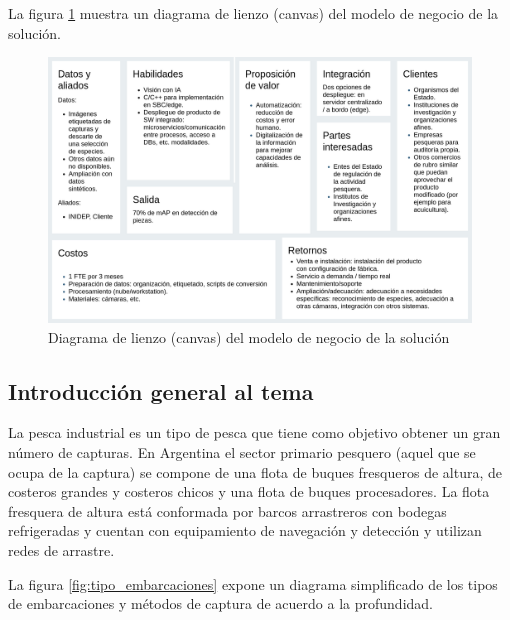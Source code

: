 \documentclass[11pt]{charter}
\begin{document}
La figura  \ref{fig:canvas} muestra un diagrama de lienzo (canvas) del modelo de negocio de la solución.

\vspace{25px}

\begin{figure}[htpb]
\centering 
\includegraphics[width=1\textwidth]{./Figuras/canvas.png}
\caption{Diagrama de lienzo (canvas) del modelo de negocio de la solución}
\label{fig:canvas}
\end{figure}

\vspace{25px}

\subsection{Introducción general al tema}

La pesca industrial es un tipo de pesca que tiene como objetivo obtener un gran número de capturas. En Argentina el sector primario pesquero (aquel que se ocupa de la captura) se compone de una flota de buques fresqueros de altura, de costeros grandes y costeros chicos y una flota de buques procesadores. La flota fresquera de altura está conformada por barcos arrastreros con bodegas refrigeradas y cuentan con equipamiento de navegación y detección y utilizan redes de arrastre.

La figura \ref{fig:tipo_embarcaciones} expone un diagrama simplificado de los tipos de embarcaciones y métodos de captura de acuerdo a la profundidad.

\vspace{25px}
\end{document}
